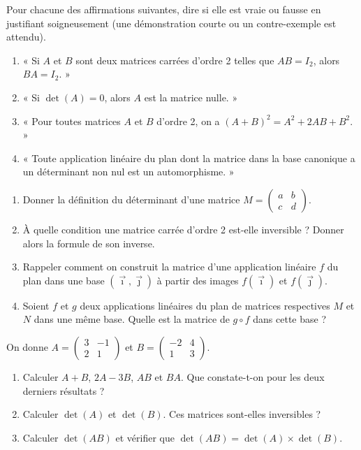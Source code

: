 \documentclass[11pt]{article}
\begin{document}
\begin{exercice}
Pour chacune des affirmations suivantes, dire si elle est vraie ou fausse en justifiant soigneusement (une démonstration courte ou un contre-exemple est attendu).
\begin{enumerate}
\item « Si $A$ et $B$ sont deux matrices carrées d'ordre 2 telles que $AB=I_2$, alors $BA=I_2$. »
\item « Si $\det(A)=0$, alors $A$ est la matrice nulle. »
\item « Pour toutes matrices $A$ et $B$ d'ordre 2, on a $(A+B)^2=A^2+2AB+B^2$. »
\item « Toute application linéaire du plan dont la matrice dans la base canonique a un déterminant non nul est un automorphisme. »
\end{enumerate}
\end{exercice}

\begin{exercice}
\begin{enumerate}
\item Donner la définition du déterminant d'une matrice $M=\begin{pmatrix} a & b \\ c & d \end{pmatrix}$.
\item À quelle condition une matrice carrée d'ordre 2 est-elle inversible ? Donner alors la formule de son inverse.
\item Rappeler comment on construit la matrice d'une application linéaire $f$ du plan dans une base $(\vec{\imath},\vec{\jmath})$ à partir des images $f(\vec{\imath})$ et $f(\vec{\jmath})$.
\item Soient $f$ et $g$ deux applications linéaires du plan de matrices respectives $M$ et $N$ dans une même base. Quelle est la matrice de $g\circ f$ dans cette base ?
\end{enumerate}
\end{exercice}

\begin{exercice}
On donne $A=\begin{pmatrix} 3 & -1 \\ 2 & 1 \end{pmatrix}$ et $B=\begin{pmatrix} -2 & 4 \\ 1 & 3 \end{pmatrix}$.
\begin{enumerate}
\item Calculer $A+B$, $2A-3B$, $AB$ et $BA$. Que constate-t-on pour les deux derniers résultats ?
\item Calculer $\det(A)$ et $\det(B)$. Ces matrices sont-elles inversibles ?
\item Calculer $\det(AB)$ et vérifier que $\det(AB)=\det(A)\times\det(B)$.
\end{enumerate}
\end{exercice}
\end{document}
